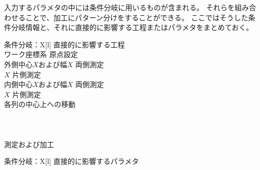 

入力するパラメタの中には条件分岐に用いるものが含まれる。
それらを組み合わせることで、加工にパターン分けをすることができる。
ここではそうした条件分岐情報と、それに直接的に影響する工程またはパラメタをまとめておく。




\begin{multicollongtblr}{条件分岐：\PMCenterCurvatureExists}{X[l]}
直接的に影響する工程\\
ワーク座標系 原点設定\\
外側中心$X$および幅$X$ 両側測定\\
\KeywayCenter$X$ 片側測定\\
内側中心$X$および幅$X$ 両側測定\\
\OutcutCenter$X$ 片側測定\\
\Dimple 各列の中心上への移動\\
\KeywayMilling\\
\EndFaceOutChamferMilling\\
\EndFaceInChamferMilling\\
\indexReliefGrooveMeasurement\indexReliefGrooveMilling\nameReliefGroove 測定および加工\\
\end{multicollongtblr}

\begin{multicollongtblr}{条件分岐：\PMBottomALBracketDimensionExists}{X[l]}
直接的に影響するパラメタ\\
\AlocationLength\\
\end{multicollongtblr}



\clearpage

